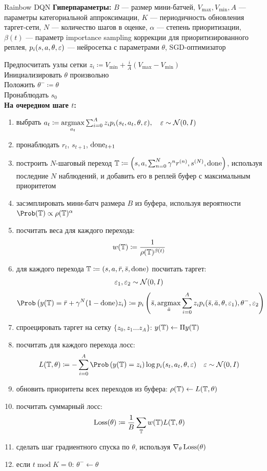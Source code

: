 \begin{algorithm}[label = rainbowalg]{Rainbow DQN}
\textbf{Гиперпараметры:} $B$ --- размер мини-батчей, $V_{\max}, V_{\min}, A$ --- параметры категориальной аппроксимации, $K$ --- периодичность обновления таргет-сети, $N$ --- количество шагов в оценке, $\alpha$ --- степень приоритизации, $\beta(t)$ --- параметр importance sampling коррекции для приоритизированного реплея, $p_i(s, a, \theta, \varepsilon)$ --- нейросетка с параметрами $\theta$, SGD-оптимизатор

\vspace{0.3cm}
Предпосчитать узлы сетки $z_i \coloneqq V_{\min} + \frac{i}{A}(V_{\max} - V_{\min})$ \\
Инициализировать $\theta$ произвольно \\
Положить $\theta^- \coloneqq \theta$ \\
Пронаблюдать $s_0$ \\
\textbf{На очередном шаге $t$:}
\begin{enumerate}
    \item выбрать $a_t \coloneqq \mathop{\mathrm{argmax}}\limits_{a_t} \sum_{i=0}^A z_i p_i(s_t, a_t, \theta, \varepsilon), \quad \varepsilon \sim \mathcal{N}(0, I)$
    \item пронаблюдать $r_t$, $s_{t+1}$, $\mathrm{done}_{t+1}$
    \item построить $N$-шаговый переход $\mathbb{T} \coloneqq \left( s, a, \sum_{n=0}^N \gamma^n r^{(n)}, s^{(N)}, \mathrm{done} \right)$, используя последние $N$ наблюдений, и добавить его в реплей буфер с максимальным приоритетом %
    \item засэмплировать мини-батч размера $B$ из буфера, используя вероятности $\Prob (\T) \propto \rho(\T)^\alpha$
    \item посчитать веса для каждого перехода:
    $$w(\mathbb{T}) \coloneqq \frac{1}{\rho(\mathbb{T})^{\beta(t)}}$$
    \item для каждого перехода $\mathbb{T} \coloneqq (s, a, \bar{r}, \bar{s}, \mathrm{done})$ посчитать таргет:
    $$\varepsilon_1, \varepsilon_2 \sim \mathcal{N}(0, I)$$
    $$\Prob \left( y(\T) = \bar{r} + \gamma^N (1 - \done) z_i \right) \coloneqq p_i\left( \bar{s}, \argmax_{\bar{a}} \sum_{i=0}^A z_i p_i(\bar{s}, \bar{a}, \theta, \eps_1), \theta^-, \eps_2 \right)$$
    \item спроецировать таргет на сетку $\{ z_0, z_1 \dots z_{A} \}$: $y(\mathbb{T}) \leftarrow \Pi y(\mathbb{T})$ 
    \item посчитать для каждого перехода лосс:
    $$L(\T, \theta) \coloneqq -\sum_{i=0}^{A} \Prob \left( y(\T) = z_i \right) \log p_i(s_t, a_t, \theta, \eps) \quad \eps \sim \N(0, I)$$
    \item обновить приоритеты всех переходов из буфера: $\rho(\mathbb{T}) \gets L(\mathbb{T}, \theta)$
    \item посчитать суммарный лосс:
    $$\operatorname{Loss}(\theta) \coloneqq \frac{1}{B}\sum_{\mathbb{T}} w(\mathbb{T})L(\mathbb{T}, \theta)$$
    \item сделать шаг градиентного спуска по $\theta$, используя $\nabla_\theta \operatorname{Loss}(\theta)$
    \item если $t \operatorname{mod} K = 0$: $\theta^- \gets \theta$
\end{enumerate}
\end{algorithm}